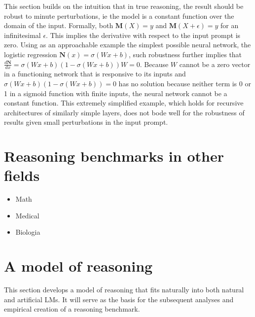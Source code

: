 \documentclass[
]{article}
\begin{document}
This section builds on the intuition that in true reasoning, the result
should be robust to minute perturbations, ie the model is a constant
function over the domain of the input. Formally, both
\(\mathbf{M}(X) = y\) and \(\mathbf{M}(X + \epsilon) = y\) for an
infinitesimal \(\epsilon\). This implies the derivative with respect to
the input prompt is zero. Using as an approachable example the simplest
possible neural network, the logistic regression
\(\mathbf{N}(x) = \sigma(Wx + b)\), such robustness further implies that
\(\frac{d\mathbf{N}}{d x} = \sigma(Wx + b)(1-\sigma(Wx + b))W = 0\).
Because \(W\) cannot be a zero vector in a functioning network that is
responsive to its inputs and \(\sigma(Wx + b)(1-\sigma(Wx + b)) = 0\)
has no solution because neither term is 0 or 1 in a sigmoid function
with finite inputs, the neural network cannot be a constant function.
This extremely simplified example, which holds for recursive
architectures of similarly simple layers, does not bode well for the
robustness of results given small perturbations in the input prompt.

\hypertarget{reasoning-benchmarks-in-other-fields}{%
\section{Reasoning benchmarks in other
fields}\label{reasoning-benchmarks-in-other-fields}}

\begin{itemize}
\item
  Math
\item
  Medical
\item
  Biologia
\end{itemize}

\hypertarget{a-model-of-reasoning}{%
\section{A model of reasoning}\label{a-model-of-reasoning}}

This section develops a model of reasoning that fits naturally into both
natural and artificial LMs. It will serve as the basis for the
subsequent analyses and empirical creation of a reasoning benchmark.
\end{document}
